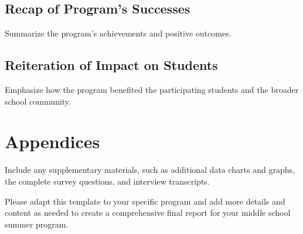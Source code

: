 \documentclass[
]{article}
\begin{document}
\hypertarget{recap-of-programs-successes}{%
\subsection{Recap of Program's
Successes}\label{recap-of-programs-successes}}

Summarize the program's achievements and positive outcomes.

\hypertarget{reiteration-of-impact-on-students}{%
\subsection{Reiteration of Impact on
Students}\label{reiteration-of-impact-on-students}}

Emphasize how the program benefited the participating students and the
broader school community.

\hypertarget{appendices}{%
\section{Appendices}\label{appendices}}

Include any supplementary materials, such as additional data charts and
graphs, the complete survey questions, and interview transcripts.

Please adapt this template to your specific program and add more details
and content as needed to create a comprehensive final report for your
middle school summer program.
\end{document}
